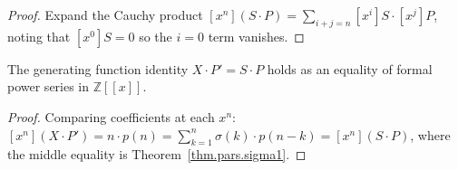 \begin{proof}
\leanok
Expand the Cauchy product $[x^n](S\cdot P) = \sum_{i+j=n} [x^i]S\cdot [x^j]P$,
noting that $[x^0]S = 0$ so the $i=0$ term vanishes.
\end{proof}

\begin{theorem}
\label{thm.pars.X-mul-derivative-P-eq-S-mul-P}
\leanhelper
\leanok
The generating function identity $X\cdot P' = S\cdot P$ holds as an equality of
formal power series in $\mathbb{Z}[[x]]$.
\end{theorem}

\begin{proof}
\leanok
Comparing coefficients at each $x^n$:
$[x^n](X\cdot P') = n\cdot p(n) = \sum_{k=1}^{n}\sigma(k)\cdot p(n-k) = [x^n](S\cdot P)$,
where the middle equality is Theorem~\ref{thm.pars.sigma1}.
\end{proof}
